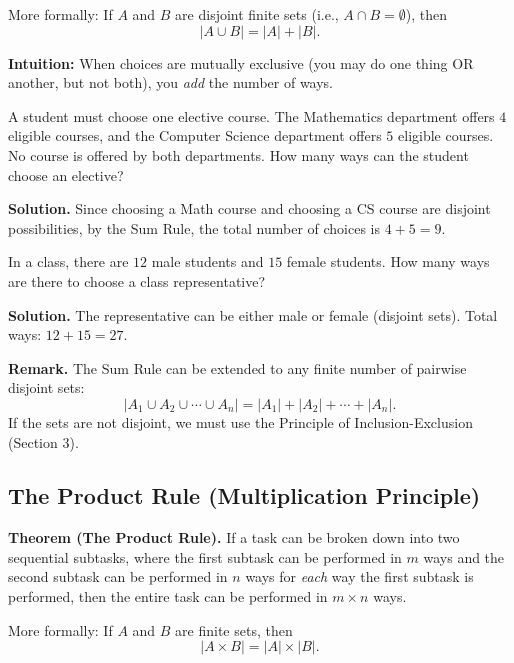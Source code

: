 \documentclass[11pt,a4paper]{article}
\begin{document}
More formally: If $A$ and $B$ are disjoint finite sets (i.e., $A \cap B = \emptyset$), then
\begin{equation*}
    |A \cup B| = |A| + |B|.
\end{equation*}

\textbf{Intuition:} When choices are mutually exclusive (you may do one thing OR another, but not both), you \textit{add} the number of ways.

\begin{example}
A student must choose one elective course. The Mathematics department offers $4$ eligible courses, and the Computer Science department offers $5$ eligible courses. No course is offered by both departments. How many ways can the student choose an elective?

\textbf{Solution.} Since choosing a Math course and choosing a CS course are disjoint possibilities, by the Sum Rule, the total number of choices is $4 + 5 = 9$.
\end{example}

\begin{example}
In a class, there are $12$ male students and $15$ female students. How many ways are there to choose a class representative?

\textbf{Solution.} The representative can be either male or female (disjoint sets). Total ways: $12 + 15 = 27$.
\end{example}

\textbf{Remark.} The Sum Rule can be extended to any finite number of pairwise disjoint sets:
\begin{equation*}
    |A_1 \cup A_2 \cup \cdots \cup A_n| = |A_1| + |A_2| + \cdots + |A_n|.
\end{equation*}
If the sets are not disjoint, we must use the Principle of Inclusion-Exclusion (Section 3).

\subsection{The Product Rule (Multiplication Principle)}

\textbf{Theorem (The Product Rule).} If a task can be broken down into two sequential subtasks, where the first subtask can be performed in $m$ ways and the second subtask can be performed in $n$ ways for \textit{each} way the first subtask is performed, then the entire task can be performed in $m \times n$ ways.

More formally: If $A$ and $B$ are finite sets, then
\begin{equation*}
    |A \times B| = |A| \times |B|.
\end{equation*}
\end{document}

